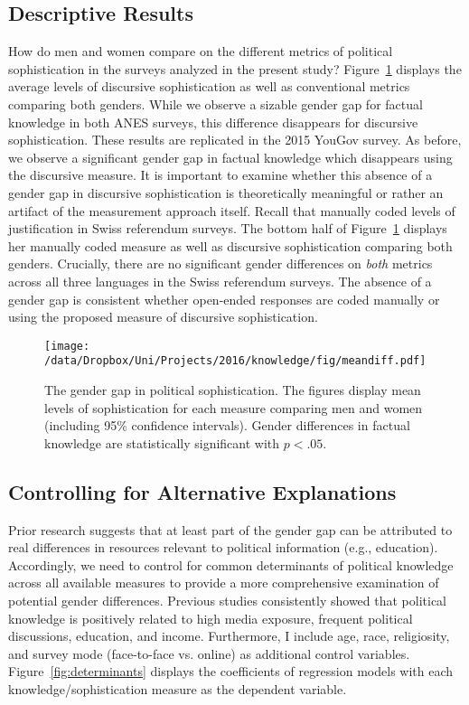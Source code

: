 \subsection*{Descriptive Results}
How do men and women compare on the different metrics of political sophistication in the surveys analyzed in the present study? Figure~\ref{fig:meandiff} displays the average levels of discursive sophistication as well as conventional metrics comparing both genders. While we observe a sizable gender gap for factual knowledge in both ANES surveys, this difference disappears for discursive sophistication. These results are replicated in the 2015 YouGov survey. As before, we observe a significant gender gap in factual knowledge which disappears using the discursive measure. It is important to examine whether this absence of a gender gap in discursive sophistication is theoretically meaningful or rather an artifact of the measurement approach itself. Recall that \citet{colombo2016justifications} manually coded levels of justification in Swiss referendum surveys. The bottom half of Figure~\ref{fig:meandiff} displays her manually coded measure as well as discursive sophistication comparing both genders. Crucially, there are no significant gender differences on \textit{both} metrics across all three languages in the Swiss referendum surveys. The absence of a gender gap is consistent whether open-ended responses are coded manually or using the proposed measure of discursive sophistication.

\begin{figure}[h]\centering
\texttt{[image: /data/Dropbox/Uni/Projects/2016/knowledge/fig/meandiff.pdf]}
\caption{The gender gap in political sophistication. The figures display mean levels of sophistication for each measure comparing men and women (including 95\% confidence intervals). Gender differences in factual knowledge are statistically significant with $p<.05$.}\label{fig:meandiff}
\end{figure}


\subsection*{Controlling for Alternative Explanations}

Prior research suggests that at least part of the gender gap can be attributed to real differences in resources relevant to political information (e.g., education). Accordingly, we need to control for common determinants of political knowledge across all available measures to provide a more comprehensive examination of potential gender differences. Previous studies consistently showed that political knowledge is positively related to high media exposure, frequent political discussions, education, and income. Furthermore, I include age, race, religiosity, and survey mode (face-to-face vs. online) as additional control variables. Figure~\ref{fig:determinants} displays the coefficients of regression models with each knowledge/sophistication measure as the dependent variable.

